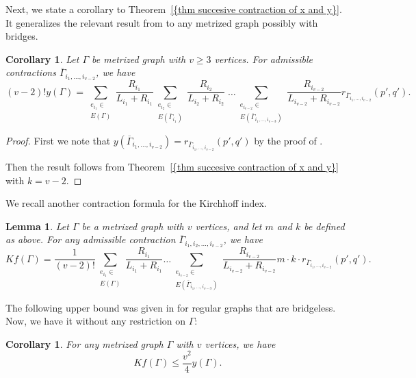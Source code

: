 \documentclass[12pt]{amsart}
\newtheorem{corollary}[theorem]{Corollary}
\newtheorem{lemma}[theorem]{Lemma}
\theoremstyle{example}
\theoremstyle{definition}
\theoremstyle{notation}
\begin{document}
Next, we state a corollary to {Theorem~\ref{{thm succesive contraction of x and y}}}. It generalizes the relevant result from \cite{C5} to any metrized graph possibly with bridges.
\begin{corollary}\label{cor contr for y k=v-2}
Let ${\Gamma}$ be metrized graph with $v \geq 3$ vertices. For admissible contractions ${{\overline{\Gamma}}}_{i_1, \dots, i_{v-2}}$, we have
$$(v-2)! y({\Gamma}) = \sum_{\substack{e_{i_1} \in
\\ {E({\Gamma})}}}\frac{R_{i_1}}{L_{i_1}+R_{i_1}} \sum_{\substack{e_{i_2} \in
\\ {E({{{\overline{\Gamma}}}_{i_1}})}}}\frac{R_{i_2}}{L_{i_2}+R_{i_2}}
\; \dots
\sum_{ \substack{e_{i_{v-2}} \in
\\ {E({{{\overline{\Gamma}}}_{i_1, \dots, i_{v-3}}})}} }
\frac{R_{i_{v-2}}}{L_{i_{v-2}}+R_{i_{v-2}}} r_{{{\overline{\Gamma}}}_{i_1,\dots, i_{v-2}}}(p',q').$$
\end{corollary}
\begin{proof}
First we note that $y({{\overline{\Gamma}}}_{i_1, \dots, i_{v-2}})=r_{{{\overline{\Gamma}}}_{i_1,\dots, i_{v-2}}}(p',q')$ by the proof of \cite[Proposition 5.8]{C5}.

Then the result follows from {Theorem~\ref{{thm succesive contraction of x and y}}} with $k=v-2$.
\end{proof}
We recall another contraction formula for the Kirchhoff index.
\begin{lemma}\cite[Lemma 5.2]{C6}\label{lem Kirchoff index successive contraction id1}
Let ${\Gamma}$ be a metrized graph with $v$ vertices, and let $m$ and $k$ be defined as above. For any admissible contraction ${{\overline{\Gamma}}}_{i_1,i_2, \dots, i_{v-2}}$, we have
$$Kf({\Gamma}) = \frac{1}{(v-2)!} \sum_{\substack{e_{i_1} \in \\ {E({\Gamma})}}}\frac{R_{i_1}}{L_{i_1}+R_{i_1}}
\dots \sum_{\substack{e_{i_{v-2}} \in \\ {E({{{\overline{\Gamma}}}_{i_1, \dots, i_{v-3}}})}}}
\frac{R_{i_{v-2}}}{L_{i_{v-2}}+R_{i_{v-2}}}  m \cdot k \cdot r_{{{\overline{\Gamma}}}_{i_1,\dots, i_{v-2}}}(p',q').$$
\end{lemma}
The following upper bound was given in \cite[Equation 21]{C6} for regular graphs that are bridgeless.
Now, we have it without any restriction on ${\Gamma}$:
\begin{corollary}\label{cor Kirchhoff upper bound}
For any metrized graph ${\Gamma}$ with $v$ vertices, we have
$$Kf({\Gamma}) \leq \frac{v^2}{4} y({\Gamma}).$$
\end{corollary}
\end{document}
